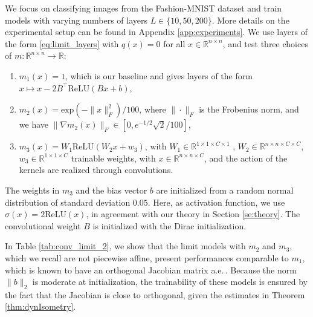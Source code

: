\documentclass{article}
\theoremstyle{plain}
\theoremstyle{definition}
\theoremstyle{definition}
\theoremstyle{remark}
\theoremstyle{definition}
\theoremstyle{definition}
\theoremstyle{remark}
\numberwithin{equation}{section}
\begin{document}
We focus on classifying images from the Fashion-MNIST dataset and train models with varying numbers of layers $L \in \{10, 50, 200\}$. More details on the experimental setup can be found in Appendix \ref{app:experiments}. We use layers of the form \eqref{eq:limit_layers} with $q(x) = 0$ for all $x \in \mathbb{R}^{n \times n}$, and test three choices of $m: \mathbb{R}^{n\times n} \to \mathbb{R}$:
\begin{enumerate}
\item $m_1(x) = 1$, which is our baseline and gives layers of the form $x \mapsto x - 2B^\top \mathrm{ReLU}(Bx + b)$,
\item $m_2(x) = \mathrm{exp}(-\|x\|_F^2)/100$, where $\|\cdot\|_F$ is the Frobenius norm, and we have $\|\nabla m_2(x)\|_F\in \left[0, e^{-1/2} \sqrt{2}/100 \right]$,
\item $m_3(x) = W_1\mathrm{ReLU}(W_2x + w_3)$, with $W_1 \in \mathbb{R}^{1\times 1\times C\times 1}$ , $W_2 \in \mathbb{R}^{n \times n \times C \times C}$, $w_3\in\mathbb{R}^{1\times 1 \times C}$ trainable weights, with $x\in\mathbb{R}^{n\times n\times C}$, and the action of the kernels are realized through convolutions.
\end{enumerate}
The weights in $m_3$ and the bias vector $b$ are initialized from a random normal distribution of standard deviation $0.05$. Here, as activation function, we use $\sigma(x)=2\mathrm{ReLU}(x)$, in agreement with our theory in Section \ref{se:theory}. The convolutional weight $B$ is initialized with the Dirac initialization.

In Table \ref{tab:conv_limit_2}, we show that the limit models with $m_2$ and $m_3$, which we recall are not piecewise affine, present performances comparable to $m_1$, which is known to have an orthogonal Jacobian matrix a.e.\,. %
Because the norm $\|b\|_2$ is moderate at initialization, the trainability of these models is ensured by the fact that the Jacobian is close to orthogonal, given the estimates in Theorem \ref{thm:dynIsometry}.
\end{document}
